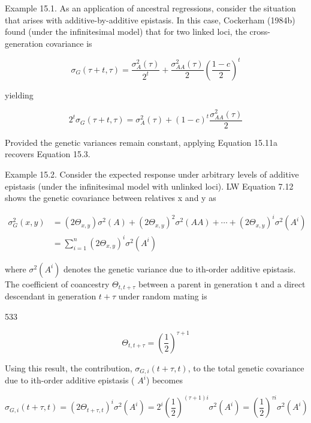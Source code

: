 \documentclass{article}
\begin{document}
Example 15.1. As an application of ancestral regressions, consider the situation that arises with additive-by-additive epistasis. In this case, Cockerham (1984b) found (under the infinitesimal model) that for two linked loci, the cross-generation covariance is

\begin{equation}
\sigma_{G}(\tau+t,\tau)=\frac{\sigma_{A}^{2}(\tau)}{2^{t}}+\frac{\sigma_{A A}^{2}(\tau)}{2}\left(\frac{1-c}{2}\right)^{t}
\end{equation}

yielding

\begin{equation}
2^{t}\sigma_{G}(\tau+t,\tau)=\sigma_{A}^{2}(\tau)+(1-c)^{t}\frac{\sigma_{A A}^{2}(\tau)}{2}
\end{equation}

Provided the genetic variances remain constant, applying Equation 15.11a recovers Equation 15.3.

Example 15.2. Consider the expected response under arbitrary levels of additive epistasis (under the infinitesimal model with unlinked loci). LW Equation 7.12 shows the genetic covariance between relatives x and y as

\begin{equation}
\begin{align*}\sigma_G^2(x,y)&=(2\Theta_{x,y})\sigma^2(A)+(2\Theta_{x,y})^2\sigma^2(AA)+\cdots+(2\Theta_{x,y})^i\sigma^2(A^i)\\&=\sum_{i=1}^n\left(2\Theta_{x,y}\right)^i\sigma^2(A^i)\end{align*}
\end{equation}

where  $ \sigma^{2}(A^{i}) $ denotes the genetic variance due to ith-order additive epistasis. The coefficient of coancestry  $ \Theta_{t,t+\tau} $ between a parent in generation t and a direct descendant in generation  $ t+\tau $ under random mating is

533

\begin{equation}
\Theta_{t,t+\tau}=\left(\frac{1}{2}\right)^{\tau+1}
\end{equation}

Using this result, the contribution,  $ \sigma_{G,i}(t+\tau,t) $, to the total genetic covariance due to ith-order additive epistasis ( $ A^{i} $) becomes

\begin{equation}
\sigma_{G,i}(t+\tau,t)=\left(2\Theta_{t+\tau,t}\right)^{i}\sigma^{2}(A^{i})=2^{i}\left(\frac{1}{2}\right)^{(\tau+1)i}\sigma^{2}(A^{i})=\left(\frac{1}{2}\right)^{\tau i}\sigma^{2}(A^{i})
\end{equation}
\end{document}
